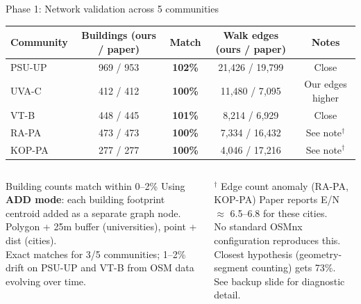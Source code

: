 \documentclass[aspectratio=169, xcolor=table]{beamer}
\newcommand{\keyterm}[1]{\textbf{\textcolor{highlightblue}{#1}}}
\begin{document}
\begin{frame}[t]{Phase 1: Network validation across 5 communities}
\footnotesize

\begin{center}
\begin{tabular}{lcccc}
\toprule
\textbf{Community} & \textbf{Buildings (ours / paper)} & \textbf{Match} & \textbf{Walk edges (ours / paper)} & \textbf{Notes} \\
\midrule
PSU-UP  & 969 / 953 & \textbf{102\%} & 21{,}426 / 19{,}799 & Close \\
UVA-C   & 412 / 412 & \textbf{100\%} & 11{,}480 / 7{,}095  & Our edges higher \\
VT-B    & 448 / 445 & \textbf{101\%} &  8{,}214 / 6{,}929  & Close \\
RA-PA   & 473 / 473 & \textbf{100\%} &  7{,}334 / 16{,}432 & See note$^{\dagger}$ \\
KOP-PA  & 277 / 277 & \textbf{100\%} &  4{,}046 / 17{,}216 & See note$^{\dagger}$ \\
\bottomrule
\end{tabular}
\end{center}

\vspace{0.5em}
\begin{columns}[T,onlytextwidth]
\begin{block}{\small Building counts match within 0--2\%}
\scriptsize
Using \keyterm{ADD mode}: each building footprint centroid added as a separate graph node.\\
Polygon + 25m buffer (universities), point + dist (cities).\\
Exact matches for 3/5 communities; 1--2\% drift on PSU-UP and VT-B from OSM data evolving over time.
\end{block}

\begin{alertblock}{\scriptsize $^{\dagger}$ Edge count anomaly (RA-PA, KOP-PA)}
\scriptsize
Paper reports E/N $\approx$ 6.5--6.8 for these cities.\\
No standard OSMnx configuration reproduces this.\\
Closest hypothesis (geometry-segment counting) gets 73\%.\\
See backup slide for diagnostic detail.
\end{alertblock}
\end{columns}
\end{frame}
\end{document}

